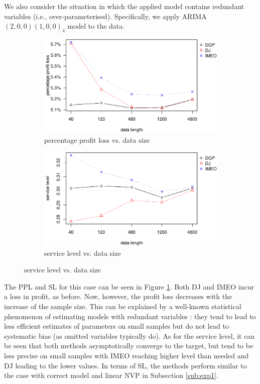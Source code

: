 \documentclass{article}
\begin{document}
We also consider the situation in which the applied model contains redundant variables (i.e., over-parameterised). Specifically, we apply ARIMA$(2,0,0)(1,0,0)_4$ model to the data.

\begin{figure}[ht]
\centering
\caption{Performance vs. sample size with over-paramaterised linear model}
\begin{subfigure}[b]{0.48\textwidth}
\centering
\includegraphics[width=\textwidth]{SAR(2)(1)_4ppl.pdf}
\caption{percentage profit loss vs. data size}
\end{subfigure}
\hfill
\begin{subfigure}[b]{0.48\textwidth}
\centering
\includegraphics[width=\textwidth]{SAR(2)(1)_4sl.pdf}
\caption{service level vs. data size}
\end{subfigure}
\label{fig:mis_over}
\end{figure}

The PPL and SL for this case can be seen in Figure \ref{fig:mis_over}. Both DJ and IMEO incur a loss in profit, as before. Now, however, the profit loss decreases with the increase of the sample size. This can be explained by a well-known statistical phenomenon of estimating models with redundant variables \cite{FG67}: they tend to lead to less efficient estimates of parameters on small samples but do not lead to systematic bias (as omitted variables typically do). As for the service level, it can be seen that both methods asymptotically converge to the target, but tend to be less precise on small samples with IMEO reaching higher level than needed and DJ leading to the lower values. In terms of SL, the methods perform similar to the case with correct model and linear NVP in Subsection \ref{sub:exp1}.
\end{document}
